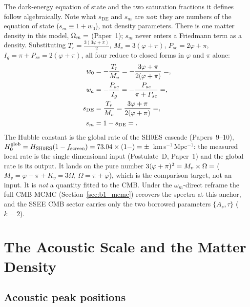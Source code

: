 \documentclass[12pt,a4paper]{article}
\begin{document}
The dark-energy equation of state and the two saturation fractions it defines
follow algebraically. Note what $s_{\mathrm{DE}}$ and $s_m$ are \emph{not}:
they are numbers of the equation of state ($s_m\equiv1+w_0$), not density
parameters. There is one matter density in this model, $\Omega_m=\val{OMEGA_M_TOTAL_d6}$
(Paper~1); $s_m$ never enters a Friedmann term as a density.
Substituting $T_r=\tfrac{3(3\varphi+\pi)}{2}$, $M_v=3(\varphi+\pi)$,
$P_{sc}=2\varphi+\pi$, $I_g=\pi+P_{sc}=2(\varphi+\pi)$, all four reduce to
closed forms in $\varphi$ and $\pi$ alone:
\begin{align}
w_0 &= -\frac{T_r}{M_v} = -\frac{3\varphi+\pi}{2(\varphi+\pi)} = \val{W0_d6}, \label{eq:w0}\\
w_a &= -\frac{P_{sc}}{I_g} = -\frac{P_{sc}}{\pi+P_{sc}} = \val{WA_d6}, \label{eq:wa}\\
s_{\mathrm{DE}} &= \frac{T_r}{M_v} = \frac{3\varphi+\pi}{2(\varphi+\pi)} = \val{S_DE_d6}, \label{eq:sDE}\\
s_m &= 1 - s_{\mathrm{DE}} = \val{S_M_d6}. \label{eq:sm}
\end{align}
The Hubble constant is the global rate of the SH0ES cascade (Papers~9--10),
$H_0^{\rm glob}=H_{\rm SH0ES}(1-f_{\rm screen})=73.04\times(1-\val{F_SCREEN_d6})=\val{H0_GLOBAL_d6}\pm\val{p9_hglob_sigma}$~km\,s$^{-1}$\,Mpc$^{-1}$:
the measured local rate is the single dimensional input (Postulate~D, Paper~1)
and the global rate is its output. It lands on the pure number
$3(\varphi+\pi)^2 = M_v\times\Omega = \val{H0_ALG_d5}$
($M_v=\varphi+\pi+K_v=3\Omega$, $\Omega=\pi+\varphi$), which is the comparison
target, not an input. It is \emph{not} a quantity fitted to the CMB. Under the
$\omega_m$-direct reframe the full CMB MCMC (Section~\ref{sec:b1_mcmc})
recovers the spectra at this anchor, and the SSEE CMB sector carries only the
two borrowed parameters $\{A_s,\tau\}$ ($k=2$).

\section{The Acoustic Scale and the Matter Density}
\label{sec:problem}

\subsection{Acoustic peak positions}
\end{document}
